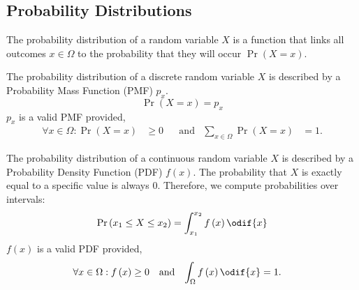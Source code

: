 \documentclass{article}
\begin{document}
\subsection{Probability Distributions}
\begin{definition}
    The probability distribution of a random variable \(X\) is a function that links all outcomes \(x \in \Omega\)
    to the probability that they will occur \(\Pr{\left( X = x \right)}\).
\end{definition}
\begin{definition}
    The probability distribution of a discrete random variable \(X\) is described by a Probability
    Mass Function (PMF) \(p_x\).
    \begin{equation*}
        \Pr{\left( X = x \right)} = p_x
    \end{equation*}
    \(p_x\) is a valid PMF provided,
    \begin{align*}
        \forall x \in \Omega : \Pr{\left( X = x \right)} & \geq 0 &  & \text{and} & \sum_{x \in \Omega} \Pr{\left( X = x \right)} & = 1.
    \end{align*}
\end{definition}
\begin{definition}
    The probability distribution of a continuous random variable \(X\) is described by a Probability
    Density Function (PDF) \(f\left( x \right)\).
    The probability that \(X\) is exactly equal to a specific value is
    always 0. Therefore, we compute probabilities over intervals:
    \begin{equation*}
        \Pr{\left( x_1 \leq X \leq x_2 \right)} = \int_{x_1}^{x_2} f\left( x \right) \odif{x}
    \end{equation*}
    \(f\left( x \right)\) is a valid PDF provided,
    \begin{align*}
        \forall x \in \Omega : f\left( x \right) & \geq 0 &  & \text{and} & \int_{\Omega} f\left( x \right) \odif{x} & = 1.
    \end{align*}
\end{definition}
\end{document}
